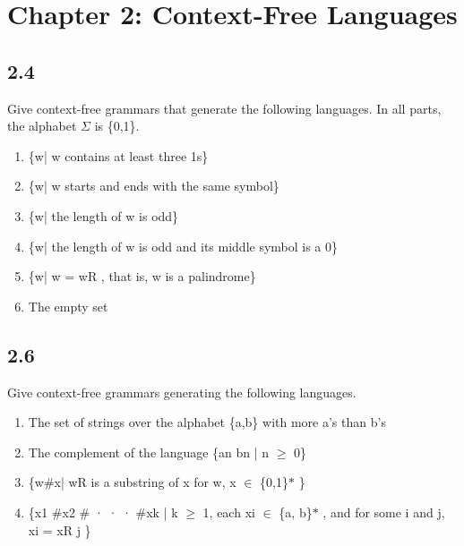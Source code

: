 \section{Chapter 2: Context-Free Languages}

\subsection*{2.4}

Give context-free grammars that generate the following languages. In all parts, the alphabet $\Sigma$ is \{0,1\}.

\begin{enumerate}[label=(\alph*), leftmargin=2.5em]

\item \{w| w contains at least three 1s\}

\item \{w| w starts and ends with the same symbol\}

\item \{w| the length of w is odd\}

\item \{w| the length of w is odd and its middle symbol is a 0\}

\item \{w| w = wR , that is, w is a palindrome\}

\item The empty set

\end{enumerate}


\subsection*{2.6}

Give context-free grammars generating the following languages.

\begin{enumerate}[label=(\alph*), leftmargin=2.5em]

\item The set of strings over the alphabet \{a,b\} with more a's than b's

\item The complement of the language \{an bn | n $\ge$ 0\}

\item \{w\#x| wR is a substring of x for w, x $\in$ \{0,1\}$\ast$ \}

\item \{x1 \#x2 \# · · · \#xk | k $\ge$ 1, each xi $\in$ \{a, b\}$\ast$ , and for some i and j, xi = xR j \}

\end{enumerate}


